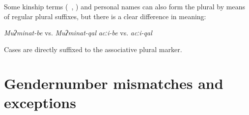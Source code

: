 Some kinship terms (\teg\ , ) and personal names can also form the plural by means of regular plural suffixes, but there is a clear difference in meaning:
%
\begin{exe}
	\ex	\label{ex:Muʔminat the people associated with her}
	\begin{xlist}
		\ex	\textit{Muʔminat-be} 
		\ex	vs. \textit{Muʔminat-qal} 
		\ex	\textit{acːi-be} 
		\ex	vs. \textit{acːi-qal} 
	\end{xlist}
\end{exe}

Cases are directly suffixed to the associative plural marker.



\section{Gender\tnd number mismatches and exceptions}
\label{sec:Gendernumbermismatchesandexceptions}

